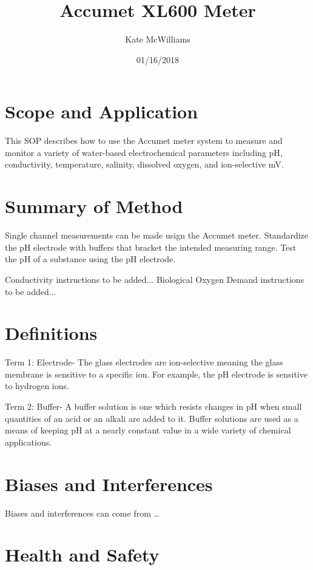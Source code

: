 \documentclass[12pt]{../SOP3_beta}\usepackage[]{graphicx}\usepackage[]{color}
\title{Accumet XL600 Meter}
\date{01/16/2018}
\author{Kate McWilliams}
\begin{document}
\maketitle

\section{Scope and Application}

\NP This SOP describes how to use the Accumet meter system to measure and monitor a variety of water-based electrochemical parameters including pH, conductivity, temperature, salinity, dissolved oxygen, and ion-selective mV.

\section{Summary of Method}

\NP Single channel measurements can be made usign the Accumet meter. Standardize the pH electrode with buffers that bracket the intended measuring range. Test the pH of a substance using the pH electrode.

\NP Conductivity instructions to be added...
\NP Biological Oxygen Demand instructions to be added...

\tableofcontents

\newpage

\section{Definitions}

\NP Term 1: Electrode- The glass electrodes are ion-selective meaning the glass membrane is sensitive to a specific ion. For example, the pH electrode is sensitive to hydrogen ions. 

\NP Term 2: Buffer- A buffer solution is one which resists changes in pH when small quantities of an acid or an alkali are added to it. Buffer solutions are used as a means of keeping pH at a nearly constant value in a wide variety of chemical applications. 

\section{Biases and Interferences}

\NP Biases and interferences can come from \dots

\section{Health and Safety}
\end{document}
